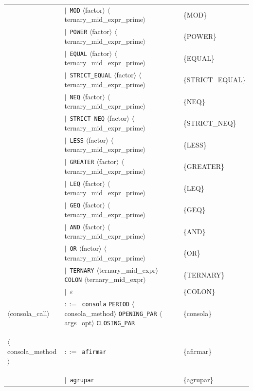 \documentclass[10pt]{article}
\begin{document}
{\begin{longtable}{@{} p{2.0cm} p{6.9cm} p{6.9cm} @{}}
   & $\mid$~\texttt{MOD} $\langle$factor$\rangle$ $\langle$ternary\_mid\_expr\_prime$\rangle$ & \{MOD\} \\
   & $\mid$~\texttt{POWER} $\langle$factor$\rangle$ $\langle$ternary\_mid\_expr\_prime$\rangle$ & \{POWER\} \\
   & $\mid$~\texttt{EQUAL} $\langle$factor$\rangle$ $\langle$ternary\_mid\_expr\_prime$\rangle$ & \{EQUAL\} \\
   & $\mid$~\texttt{STRICT\_EQUAL} $\langle$factor$\rangle$ $\langle$ternary\_mid\_expr\_prime$\rangle$ & \{STRICT\_EQUAL\} \\
   & $\mid$~\texttt{NEQ} $\langle$factor$\rangle$ $\langle$ternary\_mid\_expr\_prime$\rangle$ & \{NEQ\} \\
   & $\mid$~\texttt{STRICT\_NEQ} $\langle$factor$\rangle$ $\langle$ternary\_mid\_expr\_prime$\rangle$ & \{STRICT\_NEQ\} \\
   & $\mid$~\texttt{LESS} $\langle$factor$\rangle$ $\langle$ternary\_mid\_expr\_prime$\rangle$ & \{LESS\} \\
   & $\mid$~\texttt{GREATER} $\langle$factor$\rangle$ $\langle$ternary\_mid\_expr\_prime$\rangle$ & \{GREATER\} \\
   & $\mid$~\texttt{LEQ} $\langle$factor$\rangle$ $\langle$ternary\_mid\_expr\_prime$\rangle$ & \{LEQ\} \\
   & $\mid$~\texttt{GEQ} $\langle$factor$\rangle$ $\langle$ternary\_mid\_expr\_prime$\rangle$ & \{GEQ\} \\
   & $\mid$~\texttt{AND} $\langle$factor$\rangle$ $\langle$ternary\_mid\_expr\_prime$\rangle$ & \{AND\} \\
   & $\mid$~\texttt{OR} $\langle$factor$\rangle$ $\langle$ternary\_mid\_expr\_prime$\rangle$ & \{OR\} \\
   & $\mid$~\texttt{TERNARY} $\langle$ternary\_mid\_expr$\rangle$ \texttt{COLON} $\langle$ternary\_mid\_expr$\rangle$ & \{TERNARY\} \\
   & $\mid$~$\varepsilon$ & \{COLON\} \\
  \midrule
  \textcolor{ntcolor}{\parbox[t]{1.8cm}{\raggedright$\langle$consola\_\allowbreak{}call$\rangle$}} & $::=$~\texttt{consola} \texttt{PERIOD} $\langle$consola\_method$\rangle$ \texttt{OPENING\_PAR} $\langle$args\_opt$\rangle$ \texttt{CLOSING\_PAR} & \{consola\} \\
  \midrule
  \textcolor{ntcolor}{\parbox[t]{1.8cm}{\raggedright$\langle$consola\_\allowbreak{}method$\rangle$}} & $::=$~\texttt{afirmar} & \{afirmar\} \\
   & $\mid$~\texttt{agrupar} & \{agrupar\} \\

\end{longtable}}
\end{document}
